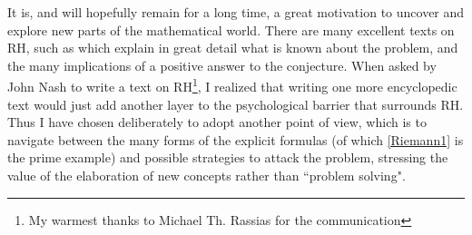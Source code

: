 \documentclass[12pt]{article}
\begin{document}
 It is, and will hopefully remain for a long time, a great motivation to uncover and explore new parts of the mathematical world. 
There are many excellent texts on RH, such as \cite{B2} which explain in great detail what is known about the problem, and the many implications of a positive answer to the conjecture. When asked by John Nash to write a text on RH\footnote{My warmest thanks to Michael Th. Rassias for the communication}, I realized that writing  one more encyclopedic text would just add another layer to the psychological barrier that surrounds  RH.  Thus I have chosen deliberately to adopt another point of view, which is to navigate between the many forms of the explicit formulas (of which \eqref{Riemann1} is the prime example) and possible strategies to attack the problem, stressing the value of the elaboration of new concepts rather than  ``problem solving". 
\end{document}

